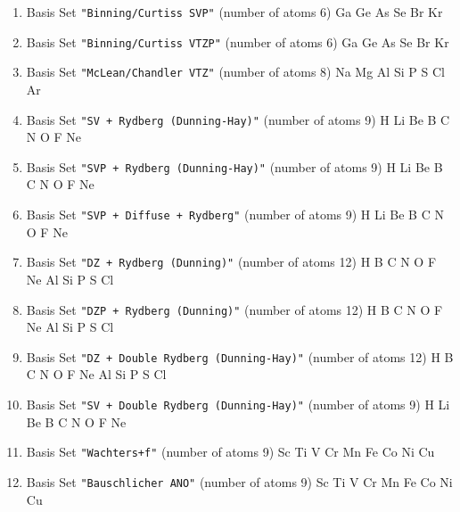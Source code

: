 \begin{enumerate}
\item Basis Set \verb#"Binning/Curtiss SVP"# (number of atoms 6)  \newline
  Ga Ge As Se Br Kr


\item Basis Set \verb#"Binning/Curtiss VTZP"# (number of atoms 6)  \newline
  Ga Ge As Se Br Kr


\item Basis Set \verb#"McLean/Chandler VTZ"# (number of atoms 8)  \newline
  Na Mg Al Si P S Cl Ar


\item Basis Set \verb#"SV + Rydberg (Dunning-Hay)"# (number of atoms 9)  \newline
  H Li Be B C N O F Ne


\item Basis Set \verb#"SVP + Rydberg (Dunning-Hay)"# (number of atoms 9)  \newline
  H Li Be B C N O F Ne


\item Basis Set \verb#"SVP + Diffuse + Rydberg"# (number of atoms 9)  \newline
  H Li Be B C N O F Ne


\item Basis Set \verb#"DZ + Rydberg (Dunning)"# (number of atoms 12)  \newline
  H B C N O F Ne Al Si P S Cl


\item Basis Set \verb#"DZP + Rydberg (Dunning)"# (number of atoms 12)  \newline
  H B C N O F Ne Al Si P S Cl


\item Basis Set \verb#"DZ + Double Rydberg (Dunning-Hay)"# (number of atoms 12)  \newline
  H B C N O F Ne Al Si P S Cl

\item Basis Set \verb#"SV + Double Rydberg (Dunning-Hay)"# (number of atoms 9)  \newline
  H Li Be B C N O F Ne


\item Basis Set \verb#"Wachters+f"# (number of atoms 9)  \newline
  Sc Ti V Cr Mn Fe Co Ni Cu


\item Basis Set \verb#"Bauschlicher ANO"# (number of atoms 9)  \newline
  Sc Ti V Cr Mn Fe Co Ni Cu


\end{enumerate}
